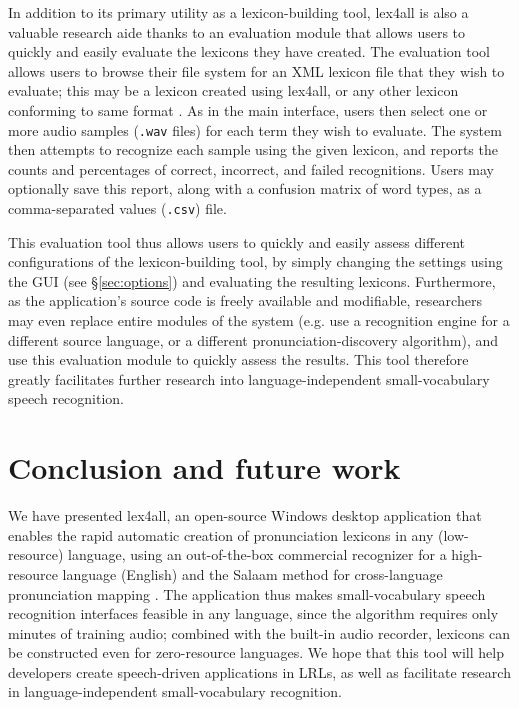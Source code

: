 \documentclass[11pt]{article}
\begin{document}
In addition to its primary utility as a lexicon-building tool, lex4all is also a valuable research aide thanks to an evaluation module that allows users to quickly and easily evaluate the lexicons they have created. The evaluation tool allows users to browse their file system for an XML lexicon file that they wish to evaluate; this may be a lexicon created using lex4all, or any other lexicon conforming to same format \cite{pls}. 
As in the main interface, users then select one or more audio samples (\texttt{.wav} files) for each term they wish to evaluate.
The system then attempts to recognize each sample using the given lexicon, and reports the counts and percentages
of correct, incorrect, and failed recognitions.
Users may optionally save this report, along with a confusion matrix of word types, as a comma-separated values (\texttt{.csv}) file.

This evaluation tool thus allows users to quickly and easily assess different configurations of the lexicon-building tool, by simply changing the settings using the GUI (see \S\ref{sec:options}) and evaluating the resulting lexicons. Furthermore, as the application's source code is freely available and modifiable, researchers may even replace entire modules of the system (e.g. use a recognition engine for a different source language, or a different pronunciation-discovery algorithm), and use this evaluation module to quickly assess the results. This tool therefore greatly facilitates further research into language-independent small-vocabulary speech recognition. 

\section{Conclusion and future work}
\label{sec:future}

We have presented lex4all, an open-source Windows desktop application that enables the rapid automatic creation of pronunciation lexicons in any (low-resource) language, using an out-of-the-box commercial recognizer \cite{mspsdk} for a high-resource language (English) and the Salaam method for cross-language pronunciation mapping \cite{Qiao10,Chan12}. The application thus makes small-vocabulary speech recognition interfaces feasible in any language, since the algorithm requires only minutes of training audio; combined with the built-in audio recorder, lexicons can be constructed even for zero-resource languages. We hope that this tool will help developers create speech-driven applications in LRLs, as well as facilitate research in language-independent small-vocabulary recognition.
\end{document}
